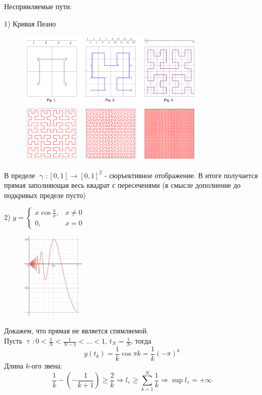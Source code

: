 \documentclass[matan]{subfiles}
\begin{document}
  \begin{examples}
      Неспрямляемые пути:

      1) Кривая Пеано
      \begin{figure}[H]
          \centering
          \includegraphics[width=9cm]{pics/32_1}
      \end{figure}

      В пределе $\upgamma: [0,1] \rightarrow [0,1]^2$ - сюръективное отображение. В итоге получается прямая заполняющая весь квадрат с пересеченями (в смысле дополнение до подкривых  пределе пусто)

      2) $y =
      \begin{cases}
         x \cos \frac{\pi}{x}, & x \neq 0\\
         0, & x = 0
       \end{cases}$

       \begin{figure}[H]
           \centering
           \includegraphics[width=3cm]{pics/32_2}
       \end{figure}

      Докажем, что прямая не является спямляемой.
      \\
      Пусть $\uptau: 0 < \frac{1}{N} < \frac{1}{N -1} < ... < 1$, $t_N = \frac{1}{N}$, тогда
      \[y(t_k) = \frac{1}{k} \cos \pi k = \frac{1}{k} (-\pi)^k\]
      Длина $k$-ого звена:
      \[\frac{1}{k} - (-\frac{1}{k+1}) \geqslant \frac{2}{k} \Rightarrow l_\uptau \geqslant \sum\limits_{k=1}^N  \frac{1}{k}\Rightarrow \sup l_\uptau = +\infty\]
  \end{examples}
\end{document}
